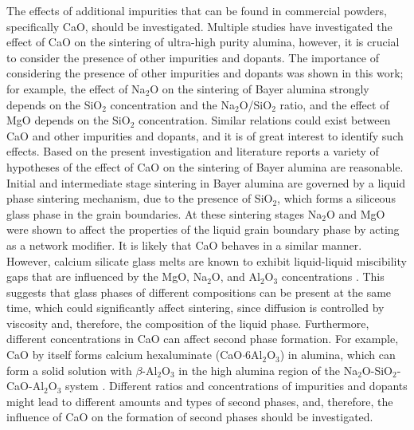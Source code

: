 The effects of additional impurities that can be found in commercial powders, specifically CaO, should be investigated. Multiple studies have investigated the effect of CaO on the sintering of ultra-high purity alumina, however, it is crucial to consider the presence of other impurities and dopants. The importance of considering the presence of other impurities and dopants was shown in this work; for example, the effect of Na$_{2}$O on the sintering of Bayer alumina strongly depends on the SiO$_{2}$ concentration and the Na$_{2}$O/SiO$_{2}$ ratio, and the effect of MgO depends on the SiO$_{2}$ concentration. Similar relations could exist between CaO and other impurities and dopants, and it is of great interest to identify such effects. Based on the present investigation and literature reports a variety of hypotheses of the effect of CaO on the sintering of Bayer alumina are reasonable. Initial and intermediate stage sintering in Bayer alumina are governed by a liquid phase sintering mechanism, due to the presence of SiO$_{2}$, which forms a siliceous glass phase in the grain boundaries. At these sintering stages Na$_{2}$O and MgO were shown to affect the properties of the liquid grain boundary phase by acting as a network modifier. It is likely that CaO behaves in a similar manner. However, calcium silicate glass melts are known to exhibit liquid-liquid miscibility gaps that are influenced by the MgO, Na$_{2}$O, and Al$_{2}$O$_{3}$ concentrations \cite{Kingery1983}. This suggests that glass phases of different compositions can be present at the same time, which could significantly affect sintering, since diffusion is controlled by viscosity and, therefore, the composition of the liquid phase. Furthermore, different concentrations in CaO can affect second phase formation. For example, CaO by itself forms calcium hexaluminate (CaO$\cdot$6Al$_{2}$O$_{3}$) in alumina, which can form a solid solution with $\beta$-Al$_{2}$O$_{3}$ in the high alumina region of the Na$_{2}$O-SiO$_{2}$-CaO-Al$_{2}$O$_{3}$ system \cite{Vries1969}. Different ratios and concentrations of impurities and dopants might lead to different amounts and types of second phases, and, therefore, the influence of CaO on the formation of second phases should be investigated.

